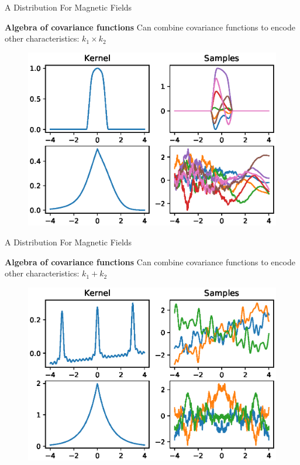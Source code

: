 \documentclass{beamer}
\begin{document}
\begin{frame}{A Distribution For Magnetic Fields}

  \textbf{Algebra of covariance functions} Can combine covariance functions to encode other characteristics: $k_1 \times k_2$

  \begin{figure}
    \includegraphics[width=\linewidth]{plots/multiply.eps}
  \end{figure}

\end{frame}


\begin{frame}{A Distribution For Magnetic Fields}

  \textbf{Algebra of covariance functions} Can combine covariance functions to encode other characteristics: $k_1 + k_2$

  \begin{figure}
    \includegraphics[width=\linewidth]{plots/sum.eps}
  \end{figure}

\end{frame}
\end{document}
